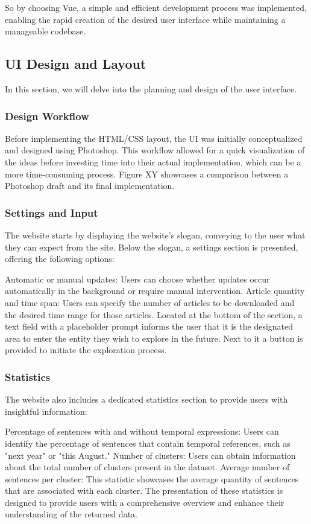\documentclass[a4paper,12pt]{report} %
\begin{document}
So by choosing Vue, a simple and efficient development process was implemented, enabling the rapid creation of the desired user interface while maintaining a manageable codebase.

\subsection{UI Design and Layout}
In this section, we will delve into the planning and design of the user interface.

\subsubsection{Design Workflow}
Before implementing the HTML/CSS layout, the UI was initially conceptualized and designed using Photoshop. This workflow allowed for a quick visualization of the ideas before investing time into their actual implementation, which can be a more time-consuming process. Figure XY showcases a comparison between a Photoshop draft and its final implementation.


\subsubsection{Settings and Input}
The website starts by displaying the website's slogan, conveying to the user what they can expect from the site. Below the slogan, a settings section is presented, offering the following options:

Automatic or manual updates: Users can choose whether updates occur automatically in the background or require manual intervention.
Article quantity and time span: Users can specify the number of articles to be downloaded and the desired time range for those articles.
Located at the bottom of the section, a text field with a placeholder prompt informs the user that it is the designated area to enter the entity they wish to explore in the future. Next to it a button is provided to initiate the exploration process.

\subsubsection{Statistics}
The website also includes a dedicated statistics section to provide users with insightful information:

Percentage of sentences with and without temporal expressions: Users can identify the percentage of sentences that contain temporal references, such as "next year" or "this August."
Number of clusters: Users can obtain information about the total number of clusters present in the dataset.
Average number of sentences per cluster: This statistic showcases the average quantity of sentences that are associated with each cluster.
The presentation of these statistics is designed to provide users with a comprehensive overview and enhance their understanding of the returned data.
\end{document}
